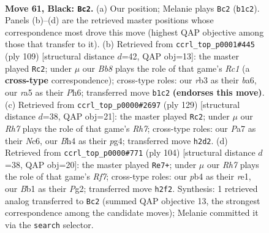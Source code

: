 \documentclass[11pt]{article}
\begin{document}
\clearpage

\begin{figure}[p]\centering
\begin{subfigure}{0.46\textwidth}\centering
\resizebox{\linewidth}{!}{%
\newchessgame
\chessboard[
  setfen={6n1/p6k/P6p/Rp3p2/1P3P1b/1R6/7r/1b4K1 b - - 1 61},
  showmover=false,
  pgfstyle=straightmove, color=movearrow, markmove={b1-c2}
]}
\caption{}
\end{subfigure}\hfill
\begin{subfigure}{0.46\textwidth}\centering
\resizebox{\linewidth}{!}{%
\newchessgame
\chessboard[
  setfen={2r5/8/Bp3k1p/5p2/1p5P/6K1/PP3P2/1Rb5 b - - 25 55},
  showmover=false,
  pgfstyle=straightmove, color=movearrow, markmove={c8-c2}
]}
\caption{}
\end{subfigure}
\\[4pt]
\begin{subfigure}{0.46\textwidth}\centering
\resizebox{\linewidth}{!}{%
\newchessgame
\chessboard[
  setfen={8/1pk5/2n5/P2Rp1p1/3p2P1/5P2/7r/R5K1 b - - 28 65},
  showmover=false,
  pgfstyle=straightmove, color=movearrow, markmove={h2-c2}
]}
\caption{}
\end{subfigure}\hfill
\begin{subfigure}{0.46\textwidth}\centering
\resizebox{\linewidth}{!}{%
\newchessgame
\chessboard[
  setfen={4k3/5R2/1p1P3N/2p1B2n/1p5P/1P5K/4r1P1/4r3 w - - 11 53},
  showmover=false,
  pgfstyle=straightmove, color=movearrow, markmove={f7-e7}
]}
\caption{}
\end{subfigure}
\caption{\textbf{Move 61, Black: \texttt{Bc2}.} (a) Our position; Melanie plays \texttt{Bc2} (\texttt{b1c2}). Panels (b)--(d) are the retrieved master positions whose correspondence most drove this move (highest QAP objective among those that transfer to it). (b) Retrieved from \texttt{ccrl\_top\_p0001\#445} (ply 109) [structural distance $d$=42, QAP obj=13]: the master played \texttt{Rc2}; under $\mu$ our \emph{Bb8} plays the role of that game's \emph{Rc1} (a \textbf{cross-type} correspondence); cross-type roles: our \emph{r}b3 as their \emph{b}a6, our \emph{r}a5 as their \emph{P}h6; transferred move \texttt{b1c2} \textbf{(endorses this move)}. (c) Retrieved from \texttt{ccrl\_top\_p0000\#2697} (ply 129) [structural distance $d$=38, QAP obj=21]: the master played \texttt{Rc2}; under $\mu$ our \emph{Rh7} plays the role of that game's \emph{Rh7}; cross-type roles: our \emph{P}a7 as their \emph{N}c6, our \emph{B}h4 as their \emph{p}g4; transferred move \texttt{h2d2}. (d) Retrieved from \texttt{ccrl\_top\_p0000\#771} (ply 104) [structural distance $d$=38, QAP obj=20]: the master played \texttt{Re7+}; under $\mu$ our \emph{Rh7} plays the role of that game's \emph{Rf7}; cross-type roles: our \emph{p}b4 as their \emph{r}e1, our \emph{B}b1 as their \emph{P}g2; transferred move \texttt{h2f2}. Synthesis: 1 retrieved analog transferred to \texttt{Bc2} (summed QAP objective 13, the strongest correspondence among the candidate moves); Melanie committed it via the \texttt{search} selector.}
\label{fig:thought-m121}
\end{figure}
\end{document}
